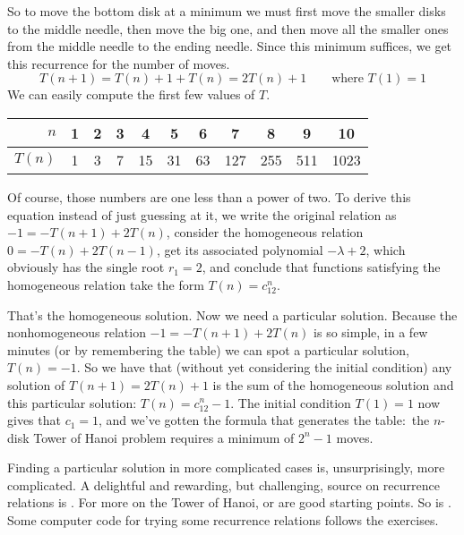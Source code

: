 So to move the bottom disk
at a minimum we must first move the smaller disks to the middle needle, 
then move the big one,
and then move all the smaller ones from the middle needle 
to the ending needle. 
Since this minimum suffices, we get this recurrence
for the number of moves.
\begin{equation*}
  T(n+1)=T(n)+1+T(n)=2T(n)+1 \qquad \text{where $T(1)=1$}
\end{equation*} 
We can easily compute the first few values of $T$.
\begin{center}
  \begin{tabular}{r|cccccccccc}
    $n$    &1  &2  &3  &4  &5  &6     &7    &8    &9   &10  \\
    \hline
    $T(n)$ &1  &3  &7  &15  &31  &63  &127  &255  &511 &1023 
  \end{tabular}
\end{center}
Of course, those numbers are one less than a power of two.
To derive this equation instead of just guessing at it, 
we write the original relation as $-1=-T(n+1)+2T(n)$, consider 
the homogeneous relation $0=-T(n)+2T(n-1)$, 
get its associated polynomial $-\lambda+2$, 
which obviously has the single root $r_1=2$, and conclude that
functions satisfying the homogeneous relation take the form $T(n)=c_12^n$.

That's the homogeneous solution.
Now we need a particular solution. 
Because the nonhomogeneous relation $-1=-T(n+1)+2T(n)$ is so simple, 
in a few minutes (or by remembering the table) 
we can spot a particular solution, $T(n)=-1$.
So we have that (without yet considering the initial condition) any solution
of $T(n+1)=2T(n)+1$ is the sum of the homogeneous solution and this
particular solution: $T(n)=c_12^n-1$.
The initial condition $T(1)=1$ now gives that $c_1=1$, and we've gotten
the formula that generates the table:~the $n$-disk Tower of Hanoi problem 
requires a minimum of $2^n-1$ moves.

Finding a particular solution in more complicated cases is, unsurprisingly,
more complicated.
A delightful and rewarding, but challenging, source on recurrence relations
is \cite{GrahamKnuthPatashnik}.
For more on the Tower of Hanoi, \cite{Ball} or \cite{Gardner57}
are good starting points. 
So is \cite{Hofstadter}.
Some computer code for trying some recurrence relations follows the 
exercises.

